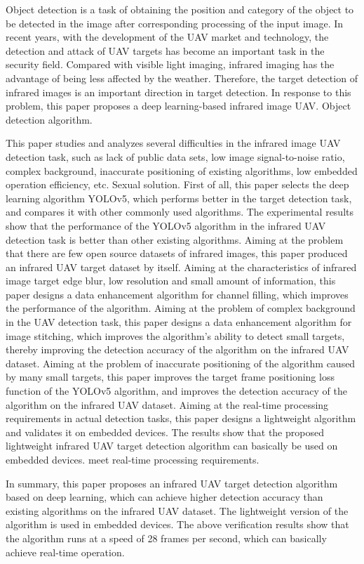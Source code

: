 \begin{eabstract}
  Object detection is a task of obtaining the position and category of the object to be detected in the image after corresponding processing of the input image. In recent years, with the development of the UAV market and technology, the detection and attack of UAV targets has become an important task in the security field. Compared with visible light imaging, infrared imaging has the advantage of being less affected by the weather. Therefore, the target detection of infrared images is an important direction in target detection. In response to this problem, this paper proposes a deep learning-based infrared image UAV. Object detection algorithm.

This paper studies and analyzes several difficulties in the infrared image UAV detection task, such as lack of public data sets, low image signal-to-noise ratio, complex background, inaccurate positioning of existing algorithms, low embedded operation efficiency, etc. Sexual solution. First of all, this paper selects the deep learning algorithm YOLOv5, which performs better in the target detection task, and compares it with other commonly used algorithms. The experimental results show that the performance of the YOLOv5 algorithm in the infrared UAV detection task is better than other existing algorithms. Aiming at the problem that there are few open source datasets of infrared images, this paper produced an infrared UAV target dataset by itself. Aiming at the characteristics of infrared image target edge blur, low resolution and small amount of information, this paper designs a data enhancement algorithm for channel filling, which improves the performance of the algorithm. Aiming at the problem of complex background in the UAV detection task, this paper designs a data enhancement algorithm for image stitching, which improves the algorithm's ability to detect small targets, thereby improving the detection accuracy of the algorithm on the infrared UAV dataset. Aiming at the problem of inaccurate positioning of the algorithm caused by many small targets, this paper improves the target frame positioning loss function of the YOLOv5 algorithm, and improves the detection accuracy of the algorithm on the infrared UAV dataset. Aiming at the real-time processing requirements in actual detection tasks, this paper designs a lightweight algorithm and validates it on embedded devices. The results show that the proposed lightweight infrared UAV target detection algorithm can basically be used on embedded devices. meet real-time processing requirements.

In summary, this paper proposes an infrared UAV target detection algorithm based on deep learning, which can achieve higher detection accuracy than existing algorithms on the infrared UAV dataset. The lightweight version of the algorithm is used in embedded devices. The above verification results show that the algorithm runs at a speed of 28 frames per second, which can basically achieve real-time operation.
\end{eabstract}
